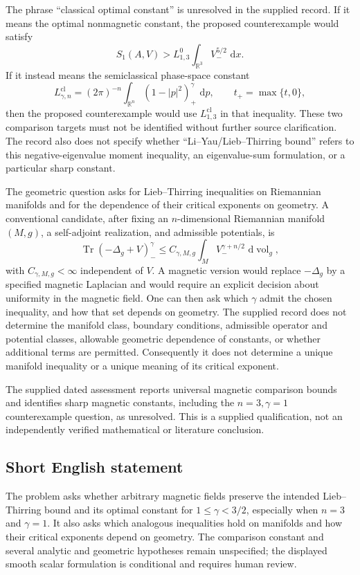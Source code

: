 \documentclass[11pt]{article}
\newcommand{\R}{\mathbb{R}}
\newcommand{\dd}{\,\mathrm{d}}
\begin{document}
The phrase ``classical optimal constant'' is unresolved in the supplied record. If it means the optimal nonmagnetic constant, the proposed counterexample would satisfy
\[
S_1(A,V)>L_{1,3}^{0}\int_{\R^3}V_-^{5/2}\,\dd x.
\]
If it instead means the semiclassical phase-space constant
\[
L_{\gamma,n}^{\mathrm{cl}}=(2\pi)^{-n}\int_{\R^n}(1-|p|^2)_+^\gamma\,\dd p,
\qquad t_+=\max\{t,0\},
\]
then the proposed counterexample would use \(L_{1,3}^{\mathrm{cl}}\) in that inequality. These two comparison targets must not be identified without further source clarification. The record also does not specify whether ``Li--Yau/Lieb--Thirring bound'' refers to this negative-eigenvalue moment inequality, an eigenvalue-sum formulation, or a particular sharp constant.

The geometric question asks for Lieb--Thirring inequalities on Riemannian manifolds and for the dependence of their critical exponents on geometry. A conventional candidate, after fixing an \(n\)-dimensional Riemannian manifold \((M,g)\), a self-adjoint realization, and admissible potentials, is
\[
\operatorname{Tr}(-\Delta_g+V)_-^\gamma
\leq C_{\gamma,M,g}\int_M V_-^{\gamma+n/2}\,\dd\operatorname{vol}_g,
\]
with \(C_{\gamma,M,g}<\infty\) independent of \(V\). A magnetic version would replace \(-\Delta_g\) by a specified magnetic Laplacian and would require an explicit decision about uniformity in the magnetic field. One can then ask which \(\gamma\) admit the chosen inequality, and how that set depends on geometry. The supplied record does not determine the manifold class, boundary conditions, admissible operator and potential classes, allowable geometric dependence of constants, or whether additional terms are permitted. Consequently it does not determine a unique manifold inequality or a unique meaning of its critical exponent.

The supplied dated assessment reports universal magnetic comparison bounds and identifies sharp magnetic constants, including the \(n=3,\gamma=1\) counterexample question, as unresolved. This is a supplied qualification, not an independently verified mathematical or literature conclusion.
\subsection{Short English statement}
The problem asks whether arbitrary magnetic fields preserve the intended Lieb--Thirring bound and its optimal constant for \(1\leq\gamma<3/2\), especially when \(n=3\) and \(\gamma=1\). It also asks which analogous inequalities hold on manifolds and how their critical exponents depend on geometry. The comparison constant and several analytic and geometric hypotheses remain unspecified; the displayed smooth scalar formulation is conditional and requires human review.
\end{document}
